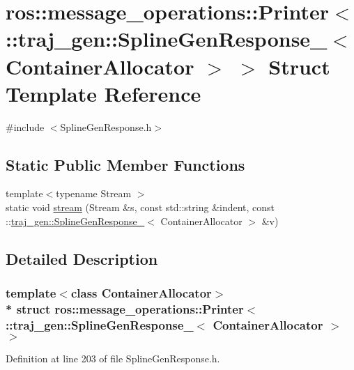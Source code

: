 \hypertarget{structros_1_1message__operations_1_1_printer_3_01_1_1traj__gen_1_1_spline_gen_response___3_01_container_allocator_01_4_01_4}{}\section{ros\+:\+:message\+\_\+operations\+:\+:Printer$<$ \+:\+:traj\+\_\+gen\+:\+:Spline\+Gen\+Response\+\_\+$<$ Container\+Allocator $>$ $>$ Struct Template Reference}
\label{structros_1_1message__operations_1_1_printer_3_01_1_1traj__gen_1_1_spline_gen_response___3_01_container_allocator_01_4_01_4}


{\ttfamily \#include $<$Spline\+Gen\+Response.\+h$>$}

\subsection*{Static Public Member Functions}
\begin{DoxyCompactItemize}
\item 
{\footnotesize template$<$typename Stream $>$ }\\static void \hyperlink{structros_1_1message__operations_1_1_printer_3_01_1_1traj__gen_1_1_spline_gen_response___3_01_container_allocator_01_4_01_4_a40f1d84398ef159c3b11b70337ea93c0}{stream} (Stream \&s, const std\+::string \&indent, const \+::\hyperlink{structtraj__gen_1_1_spline_gen_response__}{traj\+\_\+gen\+::\+Spline\+Gen\+Response\+\_\+}$<$ Container\+Allocator $>$ \&v)
\end{DoxyCompactItemize}


\subsection{Detailed Description}
\subsubsection*{template$<$class Container\+Allocator$>$\\*
struct ros\+::message\+\_\+operations\+::\+Printer$<$ \+::traj\+\_\+gen\+::\+Spline\+Gen\+Response\+\_\+$<$ Container\+Allocator $>$ $>$}



Definition at line 203 of file Spline\+Gen\+Response.\+h.



